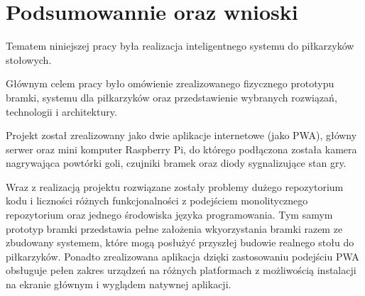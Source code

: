 \chapter{Podsumowannie oraz wnioski}
\label{ch:funplenop}

Tematem niniejszej pracy była realizacja inteligentnego systemu do piłkarzyków stołowych.

Głównym celem pracy było omówienie zrealizowanego fizycznego prototypu bramki, systemu dla piłkarzyków oraz przedstawienie wybranych rozwiązań, technologii i architektury.

Projekt został zrealizowany jako dwie aplikacje internetowe (jako PWA), główny serwer oraz mini komputer Raspberry Pi, do którego podłączona została kamera nagrywająca powtórki goli, czujniki bramek oraz diody sygnalizujące stan gry.

Wraz z realizacją projektu rozwiązane zostały problemy dużego repozytorium kodu i liczności różnych funkcjonalności z podejściem monolitycznego repozytorium oraz jednego środowiska języka programowania. Tym samym prototyp bramki przedstawia pełne założenia wkyorzystania bramki razem ze zbudowany systemem, które mogą posłużyć przyszłej budowie realnego stołu do piłkarzyków. Ponadto zrealizowana aplikacja dzięki zastosowaniu podejściu PWA obsługuje pełen zakres urządzeń na różnych platformach z możliwością instalacji na ekranie głównym i wyglądem natywnej aplikacji.